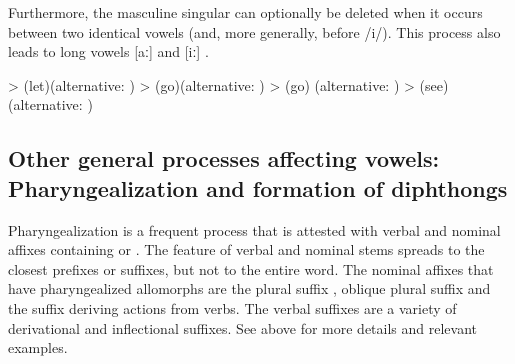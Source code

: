 Furthermore, the masculine singular   can optionally be deleted when it occurs between two identical vowels (and, more generally, before /i/). This process also leads to long vowels [aː] and [iː] .
%
\begin{exe}
	\ex	\label{ex:identical vowels B phon}
	\begin{xlist}
		\ex	{} >   (let)\newline\hspace*{1em}(alternative: )
		\ex	{} >   (go)\newline\hspace*{1em}(alternative: )
		\ex	{} >   \newline\hspace*{1em}(go) (alternative: )
		\ex	{} >   (see)\newline\hspace*{1em}(alternative: )
	\end{xlist}
\end{exe}



\subsection{Other general processes affecting vowels: Pharyngealization and formation of diphthongs}
\label{ssec:Other general processes affecting vowels}

Pharyngealization is a frequent process that is attested with verbal and nominal affixes containing  or . The  feature of verbal and nominal stems spreads to the closest prefixes or suffixes, but not to the entire word. The nominal affixes that have pharyngealized allomorphs are the plural suffix , oblique plural suffix  and the suffix  deriving actions  from verbs. The verbal suffixes are a variety of derivational and inflectional suffixes. See  above for more details and relevant examples.


